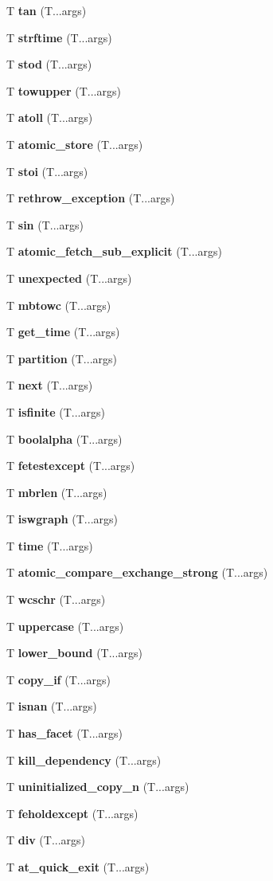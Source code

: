 \begin{DoxyCompactItemize}
T {\bf tan} (T...\+args)
\item 
T {\bf strftime} (T...\+args)
\item 
T {\bf stod} (T...\+args)
\item 
T {\bf towupper} (T...\+args)
\item 
T {\bf atoll} (T...\+args)
\item 
T {\bf atomic\+\_\+store} (T...\+args)
\item 
T {\bf stoi} (T...\+args)
\item 
T {\bf rethrow\+\_\+exception} (T...\+args)
\item 
T {\bf sin} (T...\+args)
\item 
T {\bf atomic\+\_\+fetch\+\_\+sub\+\_\+explicit} (T...\+args)
\item 
T {\bf unexpected} (T...\+args)
\item 
T {\bf mbtowc} (T...\+args)
\item 
T {\bf get\+\_\+time} (T...\+args)
\item 
T {\bf partition} (T...\+args)
\item 
T {\bf next} (T...\+args)
\item 
T {\bf isfinite} (T...\+args)
\item 
T {\bf boolalpha} (T...\+args)
\item 
T {\bf fetestexcept} (T...\+args)
\item 
T {\bf mbrlen} (T...\+args)
\item 
T {\bf iswgraph} (T...\+args)
\item 
T {\bf time} (T...\+args)
\item 
T {\bf atomic\+\_\+compare\+\_\+exchange\+\_\+strong} (T...\+args)
\item 
T {\bf wcschr} (T...\+args)
\item 
T {\bf uppercase} (T...\+args)
\item 
T {\bf lower\+\_\+bound} (T...\+args)
\item 
T {\bf copy\+\_\+if} (T...\+args)
\item 
T {\bf isnan} (T...\+args)
\item 
T {\bf has\+\_\+facet} (T...\+args)
\item 
T {\bf kill\+\_\+dependency} (T...\+args)
\item 
T {\bf uninitialized\+\_\+copy\+\_\+n} (T...\+args)
\item 
T {\bf feholdexcept} (T...\+args)
\item 
T {\bf div} (T...\+args)
\item 
T {\bf at\+\_\+quick\+\_\+exit} (T...\+args)

\end{DoxyCompactItemize}
